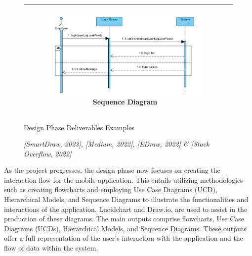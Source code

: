 \begin{figure}[ht]
\begin{tabular}{|c|c|}
		\begin{subfigure}[b]{0.44\textwidth}
			\centering
			\vspace{0.2cm}
			\includegraphics[width=0.8\linewidth]{mainmatter/images/examplesequencediagram.png}
			\caption{Sequence Diagram}
         	\label{fig:myfig38}
		\end{subfigure}	\\
		\hline		
	\end{tabular}
    \caption{Design Phase Deliverables Examples}
	\caption*{\textit{[SmartDraw, 2023], [Medium, 2022], [EDraw, 2022] \& [Stack Overflow, 2022]}}
    \label{fig:the4fig}
\end{figure}

As the project progresses, the design phase now focuses on creating the interaction flow for the mobile application. This entails utilizing methodologies such as creating flowcharts and employing Use Case Diagrams (UCD), Hierarchical Models, and Sequence Diagrams to illustrate the functionalities and interactions of the application. Lucidchart and Draw.io, are used to assist in the production of these diagrams. The main outputs comprise flowcharts, Use Case Diagrams (UCDs), Hierarchical Models, and Sequence Diagrams. These outputs offer a full representation of the user's interaction with the application and the flow of data within the system.
\pagebreak

